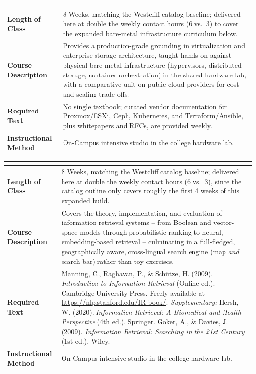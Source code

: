 \documentclass[10pt, a4paper]{article}
\begin{document}
\begin{table}[H]
\centering
\small
\renewcommand{\arraystretch}{1.25}
\begin{tabularx}{\textwidth}{|>{\bfseries}l|X|}
\hline
\rowcolor{lightgray}
\multicolumn{2}{|c|}{\textbf{CLD 400 --- Virtualization \& Storage}} \\ \hline
Length of Class & 8 Weeks, matching the Westcliff catalog baseline; delivered here at double the weekly contact hours (6 vs.\ 3) to cover the expanded bare-metal infrastructure curriculum below. \\ \hline
Course Description & Provides a production-grade grounding in virtualization and enterprise storage architecture, taught hands-on against physical bare-metal infrastructure (hypervisors, distributed storage, container orchestration) in the shared hardware lab, with a comparative unit on public cloud providers for cost and scaling trade-offs. \\ \hline
Required Text & No single textbook; curated vendor documentation for Proxmox/ESXi, Ceph, Kubernetes, and Terraform/Ansible, plus whitepapers and RFCs, are provided weekly. \\ \hline
Instructional Method & On-Campus intensive studio in the college hardware lab. \\ \hline
\end{tabularx}

\vspace{0.6em}

\begin{tabularx}{\textwidth}{|>{\bfseries}l|X|}
\hline
\rowcolor{lightgray}
\multicolumn{2}{|c|}{\textbf{TECH 400 --- Introduction to Information Retrieval}} \\ \hline
Length of Class & 8 Weeks, matching the Westcliff catalog baseline; delivered here at double the weekly contact hours (6 vs.\ 3), since the catalog outline only covers roughly the first 4 weeks of this expanded build. \\ \hline
Course Description & Covers the theory, implementation, and evaluation of information retrieval systems -- from Boolean and vector-space models through probabilistic ranking to neural, embedding-based retrieval -- culminating in a full-fledged, geographically aware, cross-lingual search engine (map \emph{and} search bar) rather than toy exercises. \\ \hline
Required Text & Manning, C., Raghavan, P., \& Sch\"utze, H. (2009). \textit{Introduction to Information Retrieval} (Online ed.). Cambridge University Press. Freely available at \url{https://nlp.stanford.edu/IR-book/}. \newline \textit{Supplementary:} Hersh, W. (2020). \textit{Information Retrieval: A Biomedical and Health Perspective} (4th ed.). Springer. \newline Goker, A., \& Davies, J. (2009). \textit{Information Retrieval: Searching in the 21st Century} (1st ed.). Wiley. \\ \hline
Instructional Method & On-Campus intensive studio in the college hardware lab. \\ \hline
\end{tabularx}
\end{table}
\end{document}
